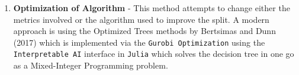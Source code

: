 \documentclass[landscape,a2paper,fontscale=0.833]{baposter}
\begin{document}
\begin{poster}
{\begin{enumerate}
    \item \textbf{Optimization of Algorithm} - This method attempts to change either the metrics involved or the algorithm used to improve the split.
    A modern approach is using the Optimized Trees methods by Bertsimas and Dunn (2017) \cite{oct} which is implemented via the \texttt{Gurobi Optimization} using the \texttt{Interpretable AI} interface in \texttt{Julia} which solves the decision tree in one go as a Mixed-Integer Programming problem.
\end{enumerate}
}

\end{poster}
\end{document}
